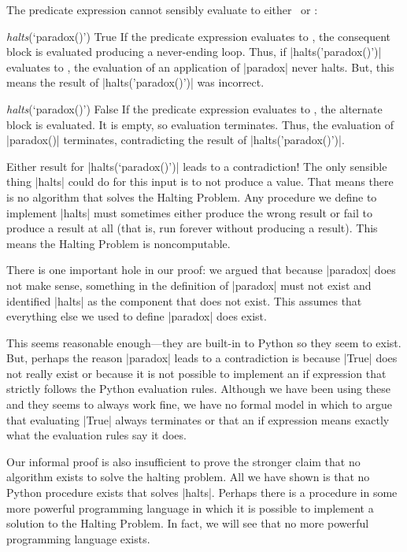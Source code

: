 \begin{schemeregion}
The predicate expression cannot sensibly evaluate to either \True\ or \False:
\begin{descriptionlist}
\item [\emph{halts}(\textsf{\small `paradox()'}) \evalsto \textsf{\small True}]\forcenl
If the predicate expression evaluates to \True, the consequent block is evaluated producing a never-ending loop.  Thus, if \pycode|halts('paradox()')| evaluates to \True, the evaluation of an application of \pycode|paradox| never halts.  But, this means the result of \pycode|halts('paradox()')| was incorrect.  
\item [\emph{halts}(\textsf{`paradox()'}) \evalsto \textsf{False}]\forcenl
If the predicate expression evaluates to \False, the alternate block is evaluated.  It is empty, so evaluation terminates.  Thus, the evaluation of \pycode|paradox()| terminates, contradicting the result of \pycode|halts('paradox()')|.
\end{descriptionlist}
Either result for \pycode|halts(`paradox()')| leads to a contradiction!  The only sensible thing \pycode|halts| could do for this input is to not produce a value. That means there is no algorithm that solves the Halting Problem.  Any procedure we define to implement \pycode|halts| must sometimes either produce the wrong result or fail to produce a result at all (that is, run forever without producing a result).  This means the Halting Problem is noncomputable.

There is one important hole in our proof: we argued that because \pycode|paradox| does not make sense, something in the definition of \pycode|paradox| must not exist and identified \pycode|halts| as the component that does not exist.  This assumes that everything else we used to define \pycode|paradox| does exist. 

This seems reasonable enough---they are built-in to Python so they seem to exist.  But, perhaps the reason \pycode|paradox| leads to a contradiction is because \pycode|True| does not really exist or because it is not possible to implement an if expression that strictly follows the Python evaluation rules.  Although we have been using these and they seems to always work fine, we have no formal model in which to argue that evaluating \pycode|True| always terminates or that an if expression means exactly what the evaluation rules say it does.  

Our informal proof is also insufficient to prove the stronger claim that no algorithm exists to solve the halting problem.  All we have shown is that no Python procedure exists that solves \pycode|halts|.  Perhaps there is a procedure in some more powerful programming language in which it is possible to implement a solution to the Halting Problem.  In fact, we will see that no more powerful programming language exists.


\end{schemeregion}
